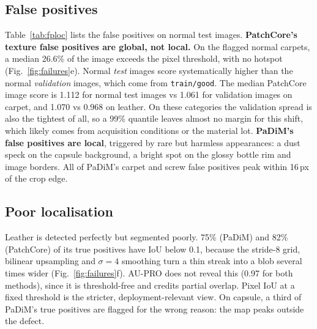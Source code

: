\subsection{False positives}
Table~\ref{tab:fploc} lists the false positives on normal test images.
\textbf{PatchCore's texture false positives are global, not local.}
On the flagged normal carpets, a median 26.6\% of the image exceeds the pixel threshold, with no hotspot (Fig.~\ref{fig:failures}e).
Normal \emph{test} images score systematically higher than the normal \emph{validation} images, which come from \texttt{train/good}.
The median PatchCore image score is 1.112 for normal test images vs 1.061 for validation images on carpet, and 1.070 vs 0.968 on leather.
On these categories the validation spread is also the tightest of all, so a 99\% quantile leaves almost no margin for this shift, which likely comes from acquisition conditions or the material lot.
\textbf{PaDiM's false positives are local}, triggered by rare but harmless appearances: a dust speck on the capsule background, a bright spot on the glossy bottle rim and image borders.
All of PaDiM's carpet and screw false positives peak within 16\,px of the crop edge.

\begin{table}[t]
  \centering
  \caption{False positives (FP) on normal test images and localisation quality of true positives (TP), PaDiM / PatchCore. IoU: median pixel IoU of TPs at the validation pixel threshold. Peak outside GT: fraction of TPs whose map maximum lies outside the GT.}
  \label{tab:fploc}
  \footnotesize
  \setlength{\tabcolsep}{2.5pt}
  
\end{table}

\subsection{Poor localisation}
Leather is detected perfectly but segmented poorly.
75\% (PaDiM) and 82\% (PatchCore) of its true positives have IoU below 0.1, because the stride-8 grid, bilinear upsampling and $\sigma=4$ smoothing turn a thin streak into a blob several times wider (Fig.~\ref{fig:failures}f).
AU-PRO does not reveal this (0.97 for both methods), since it is threshold-free and credits partial overlap.
Pixel IoU at a fixed threshold is the stricter, deployment-relevant view.
On capsule, a third of PaDiM's true positives are flagged for the wrong reason: the map peaks outside the defect.
